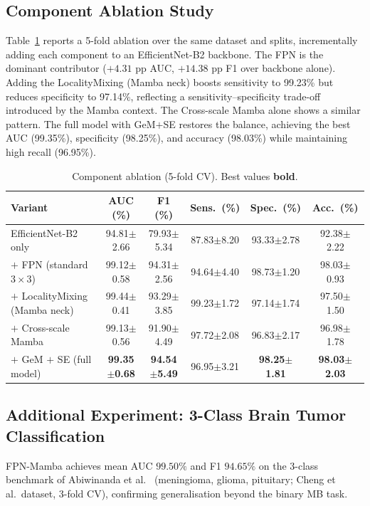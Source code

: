 \documentclass[runningheads]{llncs}
\begin{document}
\subsection{Component Ablation Study}
Table~\ref{tab:ablation} reports a 5-fold ablation over the same dataset and splits, incrementally adding each component to an EfficientNet-B2 backbone. The FPN is the dominant contributor ($+4.31$ pp AUC, $+14.38$ pp F1 over backbone alone). Adding the LocalityMixing (Mamba neck) boosts sensitivity to 99.23\% but reduces specificity to 97.14\%, reflecting a sensitivity--specificity trade-off introduced by the Mamba context. The Cross-scale Mamba alone shows a similar pattern. The full model with GeM$+$SE restores the balance, achieving the best AUC (99.35\%), specificity (98.25\%), and accuracy (98.03\%) while maintaining high recall (96.95\%).

\begin{table}[t]
\caption{Component ablation (5-fold CV). Best values \textbf{bold}.}\label{tab:ablation}
\centering
\small
\begin{tabular}{lccccc}
\toprule
\textbf{Variant} & \textbf{AUC (\%)} & \textbf{F1 (\%)} & \textbf{Sens.\ (\%)} & \textbf{Spec.\ (\%)} & \textbf{Acc.\ (\%)} \\
\midrule
EfficientNet-B2 only          & 94.81$\pm$2.66 & 79.93$\pm$5.34 & 87.83$\pm$8.20 & 93.33$\pm$2.78 & 92.38$\pm$2.22 \\
$+$ FPN (standard $3\times3$) & 99.12$\pm$0.58 & 94.31$\pm$2.56 & 94.64$\pm$4.40 & 98.73$\pm$1.20 & 98.03$\pm$0.93 \\
$+$ LocalityMixing (Mamba neck) & 99.44$\pm$0.41 & 93.29$\pm$3.85 & 99.23$\pm$1.72 & 97.14$\pm$1.74 & 97.50$\pm$1.50 \\
$+$ Cross-scale Mamba          & 99.13$\pm$0.56 & 91.90$\pm$4.49 & 97.72$\pm$2.08 & 96.83$\pm$2.17 & 96.98$\pm$1.78 \\
$+$ GeM $+$ SE (full model)    & \textbf{99.35$\pm$0.68} & \textbf{94.54$\pm$5.49} & 96.95$\pm$3.21 & \textbf{98.25$\pm$1.81} & \textbf{98.03$\pm$2.03} \\
\bottomrule
\end{tabular}
\end{table}

\subsection{Additional Experiment: 3-Class Brain Tumor Classification}
FPN-Mamba achieves mean AUC $99.50\%$ and F1 $94.65\%$ on the 3-class benchmark of Abiwinanda et al.\ \cite{abiwinanda2019} (meningioma, glioma, pituitary; Cheng et al.\ dataset, 3-fold CV), confirming generalisation beyond the binary MB task.
\end{document}
